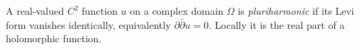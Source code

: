 
A real-valued $C^2$ function $u$ on a complex domain $\Omega$ is \emph{pluriharmonic} if its Levi form vanishes identically, equivalently $\partial\bar\partial u=0$. Locally it is the real part of a holomorphic function.
